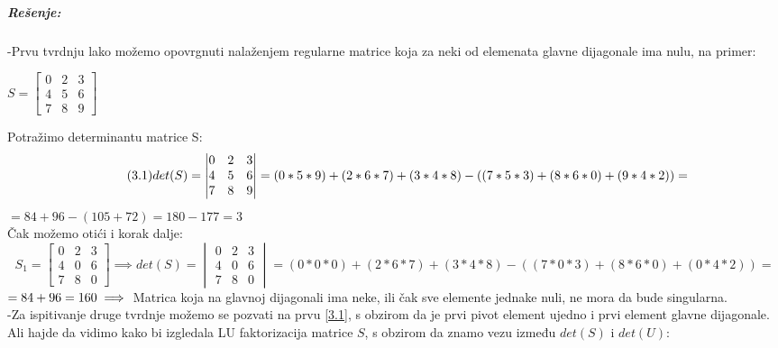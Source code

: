 \documentclass[11pt]{article}
\begin{document}
\newpage
\subparagraph*{Rešenje:}
\label{r1}
{-Prvu tvrdnju lako možemo opovrgnuti nalaženjem regularne matrice koja za neki od elemenata glavne dijagonale ima nulu, na primer:}\vspace{3mm}
\begin{center}
$
S=
\begin{bmatrix}
0 & 2 & 3\\
4 & 5 & 6\\
7 & 8 & 9
\end{bmatrix}
$
\end{center}
\vspace{3mm}
Potražimo determinantu matrice S:
\vspace{3mm}
\begin{equation*}\tag{3.1}\label{3.1}
det(S)=
\begin{vmatrix}
0 & 2 & 3\\
4 & 5 & 6\\
7 & 8 & 9
\end{vmatrix}
= (0*5*9)+(2*6*7)+(3*4*8) - ( (7*5*3) + (8*6*0) + (9*4*2) ) =\vspace{3mm}
\end{equation*}
$=84+96-(105+72)=180-177=3$
\vspace{3mm}\\
Čak možemo otići i korak dalje:\vspace{3mm}
\begin{equation*}\tag{3.2}\label{3.2}
S_1=
\begin{bmatrix}
0 & 2 & 3\\
4 & 0 & 6\\
7 & 8 & 0
\end{bmatrix}\implies
det(S)=
\begin{vmatrix}
0 & 2 & 3\\
4 & 0 & 6\\
7 & 8 & 0
\end{vmatrix}
= (0*0*0)+(2*6*7)+(3*4*8) - ( (7*0*3) + (8*6*0) + (0*4*2) )=
\end{equation*}
$=84+96=160 \vspace{3mm} \\
\implies$
{Matrica koja na glavnoj dijagonali ima neke, ili čak sve elemente jednake nuli, ne mora da bude singularna.}\vspace{3mm}\\
-Za ispitivanje druge tvrdnje možemo se pozvati na prvu \eqref{3.1}, s obzirom da je prvi pivot element ujedno i prvi element glavne dijagonale.
\\Ali hajde da vidimo kako bi izgledala LU faktorizacija matrice $S$, s obzirom da znamo vezu između $det(S)$ i $det(U)$:
\end{document}
